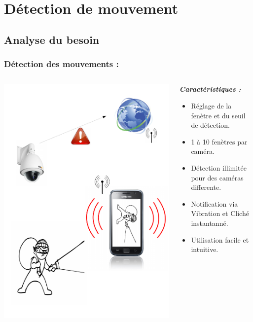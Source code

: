 
\section{Détection de mouvement}
 \subsection{Analyse du besoin}
  \begin{frame}
   \frametitle{Détection des mouvements :}



\begin{columns}
\begin{column}{5cm}

   \includegraphics[scale=0.25]{Images/ImageSlide10.pdf}
\end{column}
\begin{column}{7cm}
\textbf{\textit{Caractéristiques :}} 
\begin{itemize}
    \item Réglage de la fenètre et du seuil de détection.
  	\item 1 à 10 fenètres par caméra.
  	\item Détection illimitée pour des caméras differente.
 	\item Notification via Vibration et Cliché instantanné.
 	\item Utilisation facile et intuitive.
\end{itemize}
\end{column}
\end{columns}
  \end{frame}
